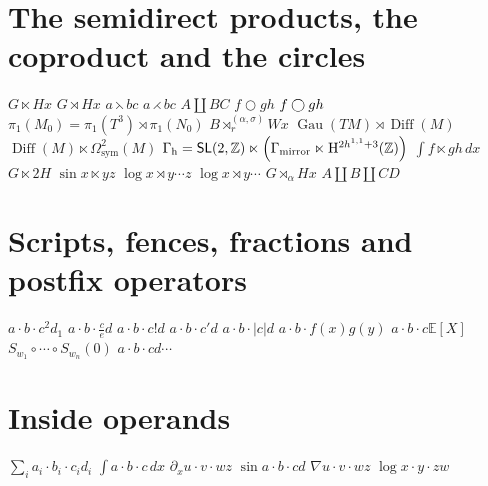 \documentclass{article}
\begin{document}
\section{The semidirect products, the coproduct and the circles}
$G\ltimes H x$ $G\rtimes H x$ $a\leftthreetimes b c$ $a\rightthreetimes b c$ $A\amalg B C$ $f\bigcirc g h$ $f\varbigcirc g h$
$\pi_1(M_0)=\pi_1(T^3)\rtimes\pi_1(N_0)$ $B\rtimes_{r}^{(\alpha,\sigma)}W x$ $\operatorname{Gau}(TM)\rtimes\operatorname{Diff}(M)$ $\operatorname{Diff}(M)\ltimes\Omega^{2}_{\mathrm{sym}}(M)$
$\Gamma_{\rm h}=\mathsf{SL}(2,\mathbb{Z})\ltimes\left(\Gamma_{\rm mirror}\ltimes{\rm H}^{2h^{1,1}+3}(\mathbb{Z})\right)$ $\int f\ltimes g h\,dx$ $G\ltimes 2H$
$\sin x\ltimes y z$ $\log x\rtimes y\cdots z$ $\log x\rtimes y\cdots$ $G\rtimes_\alpha H x$ $A\amalg B\amalg C D$

\section{Scripts, fences, fractions and postfix operators}
$a\cdot b\cdot c^2 d_1$ $a\cdot b\cdot\frac{c}{e}d$ $a\cdot b\cdot c!d$ $a\cdot b\cdot c'd$ $a\cdot b\cdot|c|d$
$a\cdot b\cdot f(x)g(y)$ $a\cdot b\cdot c\mathbb{E}[X]$ $S_{w_1}\circ\cdots\circ S_{w_n}(0)$ $a\cdot b\cdot c d\cdots$

\section{Inside operands}
$\sum_i a_i\cdot b_i\cdot c_i d_i$ $\int a\cdot b\cdot c\,dx$ $\partial_x u\cdot v\cdot w z$ $\sin a\cdot b\cdot c d$
$\nabla u\cdot v\cdot w z$ $\log x\cdot y\cdot z w$

\end{document}
